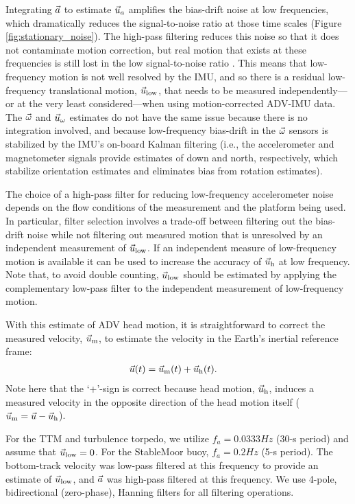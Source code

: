 Integrating ${\vec{a}}$ to estimate $\vec{u}_a$ amplifies the bias-drift noise at low frequencies, which dramatically reduces the signal-to-noise ratio at those time scales (Figure \ref{fig:stationary_noise}).  The high-pass filtering reduces this noise so that it does not contaminate motion correction, but real motion that exists at these frequencies is still lost in the low signal-to-noise ratio \cite[]{EgelandPhD2014, VanZwieten++2015}. This means that low-frequency motion is not well resolved by the IMU, and so there is a residual low-frequency translational motion, $\vec{u}_\mathrm{low}$, that needs to be measured independently---or at the very least considered---when using motion-corrected ADV-IMU data. The $\vec{\omega}$ and $\vec{u}_\omega$ estimates do not have the same issue because there is no integration involved, and because low-frequency bias-drift in the $\vec{\omega}$ sensors is stabilized by the IMU's on-board Kalman filtering (i.e., the accelerometer and magnetometer signals provide estimates of down and north, respectively, which stabilize orientation estimates and eliminates bias from rotation estimates).

The choice of a high-pass filter for reducing low-frequency accelerometer noise depends on the flow conditions of the measurement and the platform being used. In particular, filter selection involves a trade-off between filtering out the bias-drift noise while not filtering out measured motion that is unresolved by an independent measurement of $\vec{u}_\mathrm{low}$. If an independent measure of low-frequency motion is available it can be used to increase the accuracy of $\vec{u}_\mathrm{h}$ at low frequency. Note that, to avoid double counting, $\vec{u}_\mathrm{low}$ should be estimated by applying the complementary low-pass filter to the independent measurement of low-frequency motion.

With this estimate of ADV head motion, it is straightforward to correct the measured velocity, $\vec{u}_\mathrm{m}$, to estimate the velocity in the Earth's inertial reference frame:
\begin{align}
  \label{eqn:u_mot_def}
  \vec{u}(t) & = \vec{u}_\mathrm{m}(t) + \vec{u}_\mathrm{h}(t).
\end{align}
Note here that the `+'-sign is correct because head motion, $\vec{u}_\mathrm{h}$, induces a measured velocity in the opposite direction of the head motion itself ($\vec{u}_\mathrm{m} = \vec{u} - \vec{u}_\mathrm{h}$).

For the TTM and turbulence torpedo, we utilize $f_a = 0.0333 Hz$ (30-s period) and assume that $\vec{u}_\mathrm{low} = 0$. For the StableMoor buoy, $f_a = 0.2 Hz$ (5-s
period). The bottom-track velocity was low-pass filtered at this frequency to provide an estimate of $\vec{u}_\mathrm{low}$, and ${\vec{a}}$ was high-pass filtered at this frequency. We use 4-pole, bidirectional (zero-phase), Hanning filters for all filtering operations. 


